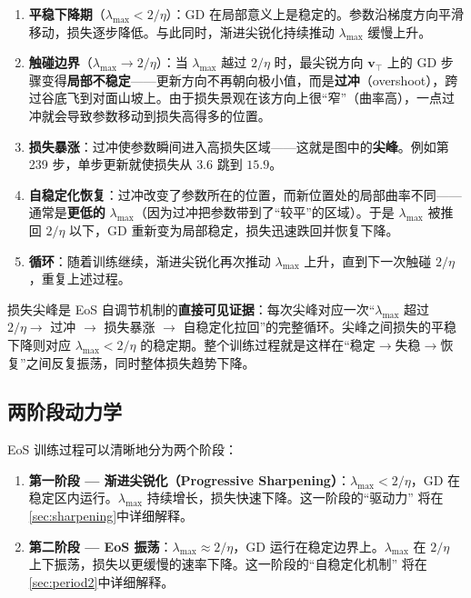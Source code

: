 \documentclass[11pt,a4paper]{ctexart}
\newcommand{\lmax}{\lambda_{\max}}
\newcommand{\vtopv}{\mathbf{v}_{\!\top}}
\begin{document}
\begin{enumerate}[leftmargin=2em]
  \item \textbf{平稳下降期}（$\lmax < 2/\eta$）：GD 在局部意义上是稳定的。参数沿梯度方向平滑移动，损失逐步降低。与此同时，渐进尖锐化持续推动 $\lmax$ 缓慢上升。

  \item \textbf{触碰边界}（$\lmax \to 2/\eta$）：当 $\lmax$ 越过 $2/\eta$ 时，最尖锐方向 $\vtopv$ 上的 GD 步骤变得\textbf{局部不稳定}——更新方向不再朝向极小值，而是\textbf{过冲}（overshoot），跨过谷底飞到对面山坡上。由于损失景观在该方向上很``窄''（曲率高），一点过冲就会导致参数移动到损失高得多的位置。

  \item \textbf{损失暴涨}：过冲使参数瞬间进入高损失区域——这就是图中的\textbf{尖峰}。例如第 239 步，单步更新就使损失从 $3.6$ 跳到 $15.9$。

  \item \textbf{自稳定化恢复}：过冲改变了参数所在的位置，而新位置处的局部曲率不同——通常是\textbf{更低的} $\lmax$（因为过冲把参数带到了``较平''的区域）。于是 $\lmax$ 被推回 $2/\eta$ 以下，GD 重新变为局部稳定，损失迅速跌回并恢复下降。

  \item \textbf{循环}：随着训练继续，渐进尖锐化再次推动 $\lmax$ 上升，直到下一次触碰 $2/\eta$，重复上述过程。
\end{enumerate}

\begin{keybox}
损失尖峰是 EoS 自调节机制的\textbf{直接可见证据}：每次尖峰对应一次``$\lmax$ 超过 $2/\eta \to$ 过冲 $\to$ 损失暴涨 $\to$ 自稳定化拉回''的完整循环。尖峰之间损失的平稳下降则对应 $\lmax < 2/\eta$ 的稳定期。整个训练过程就是这样在``稳定$\to$失稳$\to$恢复''之间反复振荡，同时整体损失趋势下降。
\end{keybox}

\subsection{两阶段动力学}

EoS 训练过程可以清晰地分为两个阶段：

\begin{enumerate}[leftmargin=2em]
  \item \textbf{第一阶段 — 渐进尖锐化（Progressive Sharpening）}：$\lmax < 2/\eta$，GD 在稳定区内运行。$\lmax$ 持续增长，损失快速下降。这一阶段的``驱动力'' 将在\cref{sec:sharpening}中详细解释。

  \item \textbf{第二阶段 — EoS 振荡}：$\lmax \approx 2/\eta$，GD 运行在稳定边界上。$\lmax$ 在 $2/\eta$ 上下振荡，损失以更缓慢的速率下降。这一阶段的``自稳定化机制'' 将在\cref{sec:period2}中详细解释。
\end{enumerate}
\end{document}
